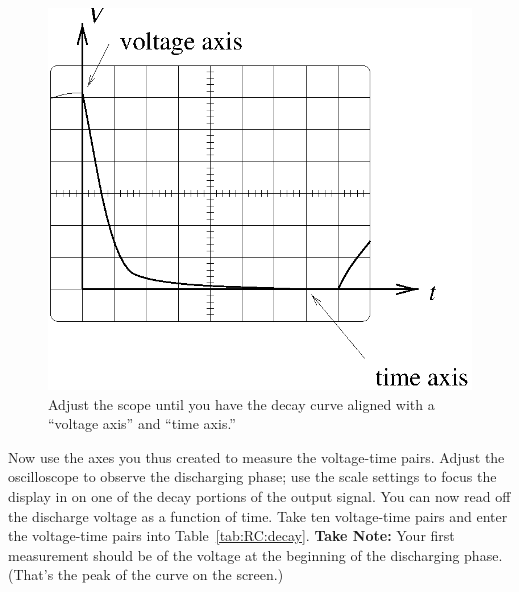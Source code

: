 \begin{figure}[htb]
\epsfxsize=8cm
\centering 
\includegraphics[scale=0.5]{5_rccircuits/scope.eps}
\caption{Adjust the scope until you have the decay curve aligned with a 
``voltage axis'' and ``time axis.''}
\label{fig:scope}
\end{figure}

\noindent Now use the axes you thus created to measure the voltage-time pairs.
Adjust the oscilloscope to observe the discharging phase; 
use the scale 
settings to focus the display in on one of the decay portions of the output
signal. You can now read off the discharge voltage as a function of time. Take 
ten voltage-time pairs and enter the voltage-time pairs into 
Table~\ref{tab:RC:decay}.
{\bf Take Note:} Your first measurement should be of the 
voltage at the beginning of
the discharging phase. (That's the peak of the curve on the screen.) 

